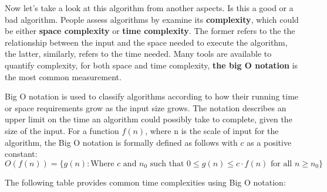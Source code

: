 \documentclass[
	12pt, %
	fleqn, %
	a4paper, %
]{LegrandOrangeBook}
\begin{document}
\par Now let's take a look at this algorithm from another aspects. Is this a good or a bad algorithm. People assess algorithms by examine its \textbf{complexity}, which could be either \textbf{space complexity} or \textbf{time complexity}. The former refers to the the relationship between the input and the space needed to execute the algorithm, the latter, similarly, refers to the time needed. Many tools are available to quantify complexity, for both space and time complexity, \textbf{the big O notation} is the most common measurement. 
\begin{definition}\label{Big O}
    Big O notation is used to classify algorithms according to how their running time or space requirements grow as the input size grows. The notation describes an upper limit on the time an algorithm could possibly take to complete, given the size of the input. For a function \( f(n) \), where n is the scale of input for the algorithm, the Big O notation is formally defined as follows with $c$ as a positive constant:
    $$O(f(n)) = \{ g(n) : \text{Where } c \text{ and } n_0 
	\text{ such that } 0 \leq g(n) \leq c \cdot f(n) \text{ for all } n \geq n_0 \}$$
\end{definition}

The following table provides common time complexities using Big O notation:
\end{document}
